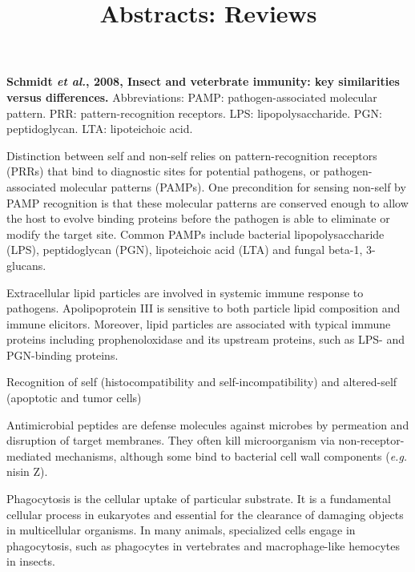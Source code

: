\documentclass[11pt]{article}
\title{Abstracts: Reviews}
\author{}
\date{}
\begin{document}
\begin{sloppypar}
  \maketitle

  \linenumbers
\textbf{Schmidt \textit{et al.}, 2008, Insect and veterbrate immunity: key similarities versus differences.} \newline
Abbreviations: \newline
PAMP: pathogen-associated molecular pattern.\newline
PRR: pattern-recognition receptors.\newline
LPS: lipopolysaccharide.\newline
PGN: peptidoglycan.\newline
LTA: lipoteichoic acid.
\par
Distinction between self and non-self relies on pattern-recognition receptors (PRRs) that bind to diagnostic sites for potential pathogens, or pathogen-associated molecular patterns (PAMPs). 
One precondition for sensing non-self by PAMP recognition is that these molecular patterns are conserved enough to allow the host to evolve binding proteins before the pathogen is able to eliminate or modify the target site. 
Common PAMPs include bacterial lipopolysaccharide (LPS), peptidoglycan (PGN), lipoteichoic acid (LTA) and fungal beta-1, 3-glucans.
\par
Extracellular lipid particles are involved in systemic immune response to pathogens. 
Apolipoprotein III is sensitive to both particle lipid composition and immune elicitors. 
Moreover, lipid particles are associated with typical immune proteins including prophenoloxidase and its upstream proteins, such as LPS- and PGN-binding proteins. 
\par
Recognition of self (histocompatibility and self-incompatibility) and altered-self (apoptotic and tumor cells)
\par
Antimicrobial peptides are defense molecules against microbes by permeation and disruption of target membranes. 
They often kill microorganism via non-receptor-mediated mechanisms, although some bind to bacterial cell wall components (\textit{e.g.} nisin Z). 
\par
Phagocytosis is the cellular uptake of particular substrate. 
It is a fundamental cellular process in eukaryotes and essential for the clearance of damaging objects in multicellular organisms. 
In many animals, specialized cells engage in phagocytosis, such as phagocytes in vertebrates and macrophage-like hemocytes in insects.

\end{sloppypar}
\end{document}
